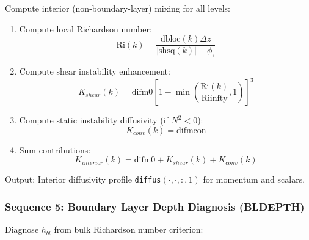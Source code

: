 \documentclass[11pt, a4paper]{article}
\begin{document}
Compute interior (non-boundary-layer) mixing for all levels:

\begin{enumerate}
    \item Compute local Richardson number:
    \begin{equation}
    \text{Ri}(k) = \frac{\text{dbloc}(k) \Delta z}{|\text{shsq}(k)| + \phi_\epsilon}
    \end{equation}
    
    \item Compute shear instability enhancement:
    \begin{equation}
    K_{shear}(k) = \text{difm0} \left[1 - \min\left(\frac{\text{Ri}(k)}{\text{Riinfty}}, 1\right)\right]^3
    \end{equation}
    
    \item Compute static instability diffusivity (if $N^2 < 0$):
    \begin{equation}
    K_{conv}(k) = \text{difmcon}
    \end{equation}
    
    \item Sum contributions:
    \begin{equation}
    K_{interior}(k) = \text{difm0} + K_{shear}(k) + K_{conv}(k)
    \end{equation}
\end{enumerate}

Output: Interior diffusivity profile \texttt{diffus}$(\cdot, \cdot, :, 1)$ for momentum and scalars.

\subsubsection{Sequence 5: Boundary Layer Depth Diagnosis (BLDEPTH)}

Diagnose $h_{bl}$ from bulk Richardson number criterion:
\end{document}
